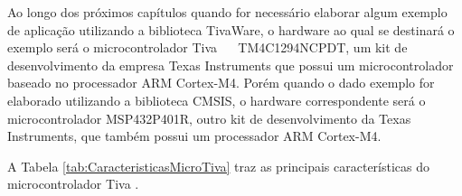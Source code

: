Ao longo dos próximos capítulos quando for necessário elaborar algum exemplo de aplicação utilizando a biblioteca TivaWare, o hardware ao qual se destinará o exemplo será o microcontrolador  Tiva \texttrademark ~~ TM4C1294NCPDT, um kit de desenvolvimento da empresa Texas Instruments que possui um microcontrolador baseado no processador ARM Cortex-M4. Porém quando o dado exemplo for elaborado utilizando a biblioteca CMSIS, o hardware correspondente será o microcontrolador MSP432P401R\texttrademark, outro kit de desenvolvimento da Texas Instruments, que também possui um processador ARM Cortex-M4.  

A Tabela \ref{tab:CaracteristicasMicroTiva} traz as principais características do microcontrolador Tiva \texttrademark. 


